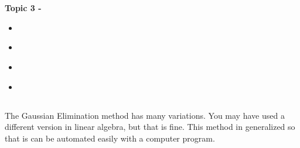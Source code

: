 \documentclass[fleqn]{beamer} %
\newcommand{\sectionIVtitle}{}
\newcommand{\sectionIVsubsectionItitle}{}
\newcommand{\sectionIVsubsectionIItitle}{}
\newcommand{\sectionIVsubsectionIIItitle}{}
\newcommand{\sectionIVsubsectionIVtitle}{}
\begin{document}
	\section{\sectionIVtitle}\label{sectionIV}

		\begin{frame}
			\large \textbf{Topic 3 - \sectionIVtitle} \vspace{3mm}\\

			\begin{itemize}
				\item \hyperlink{sectionIVsubsectionI}{\sectionIVsubsectionItitle} \vspc %
				\item \hyperlink{sectionIVsubsectionII}{\sectionIVsubsectionIItitle} \vspc %
				\item \hyperlink{sectionIVsubsectionIII}{\sectionIVsubsectionIIItitle} \vspc %
				\item \hyperlink{sectionIVsubsectionIV}{\sectionIVsubsectionIVtitle} \vspc %
			\end{itemize}

		\end{frame}

		\subsection{\sectionIVsubsectionItitle}\label{sectionIVsubsectionI}

			\begin{frame}
				\frametitle{\sectionIVsubsectionItitle}
				\bigskip

				The Gaussian Elimination method has many variations.  You may have used a different version in linear algebra, but that is fine. This method in generalized so that is can be automated easily with a computer program.   

				\btVFill
			\end{frame}

			\begin{frame}
				\frametitle{\sectionIVsubsectionItitle}
				\bigskip


				\btVFill
			\end{frame}

		\subsection{\sectionIVsubsectionIItitle}\label{sectionIVsubsectionII}
\end{document}
